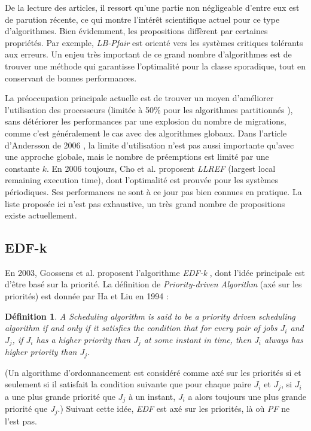 \documentclass[11pt,a4paper,oneside]{report}
\newtheorem{mydef}{Définition}
\begin{document}
	De la lecture des articles, il ressort qu'une partie non négligeable d'entre eux 
	est de parution récente, ce qui montre l'intérêt scientifique actuel pour ce type d'algorithmes. 
	Bien évidemment, les propositions diffèrent par certaines propriétés. Par exemple, 
	\textit{LB-Pfair} est orienté vers les systèmes critiques tolérants aux erreurs. 
	Un enjeu très important de ce grand nombre d'algorithmes est de trouver une méthode qui 
	garantisse l'optimalité pour la classe sporadique, tout en conservant de bonnes performances. 
	
	La préoccupation principale actuelle est de trouver un moyen d'améliorer l'utilisation des processeurs (limitée à 
	50\% pour les algorithmes partitionnés \cite{oh_utilization_1998}), sans détériorer les performances par 
	une explosion du nombre de migrations, comme c'est généralement le cas avec des algorithmes globaux. 
	Dans l'article d'Andersson de 2006 \cite{andersson_multiprocessor_2006}, la limite d'utilisation 
	n'est pas aussi importante qu'avec une approche globale, mais le nombre de préemptions est limité par 
	une constante $k$. En 2006 toujours, Cho et al. \cite{cho_optimal_2006} proposent \textit{LLREF} 
	(largest local remaining execution time), dont l'optimalité est prouvée pour les 
	systèmes périodiques. Ses performances ne sont à ce jour pas bien connues en pratique. 
	La liste proposée ici n'est pas exhaustive, un très grand nombre de propositions existe actuellement. 
	
	\subsection{EDF-k}
	En 2003, Goossens et al. proposent l'algorithme \textit{EDF-k} \cite{goossens_priority-driven_2003}, 
	dont l'idée principale est d'être basé sur la priorité. 
	La définition de \textit{Priority-driven Algorithm} (axé sur les priorités) 
	est donnée par Ha et Liu en 1994 :
	\begin{mydef}
		A Scheduling algorithm is said to be a priority driven scheduling algorithm if and 
		only if it satisfies the condition 
		that for every pair of jobs $J_i$ and $J_j$, if $J_i$ has a higher priority than $J_j$ at 
		some instant in time, then $J_i$ always has higher priority than $J_j$.
	\end{mydef}
	(Un algorithme d'ordonnancement est considéré comme axé sur les priorités si et seulement si il 
	satisfait la condition suivante que pour chaque paire $J_i$ et $J_j$, si $J_i$ a une plus 
	grande priorité que $J_j$ à un instant, $J_i$ a alors toujours une plus grande priorité 
	que $J_j$.)\medskip
	Suivant cette idée, \textit{EDF} est axé sur les priorités, là où \textit{PF} ne l'est pas.\medskip
	
\end{document}
